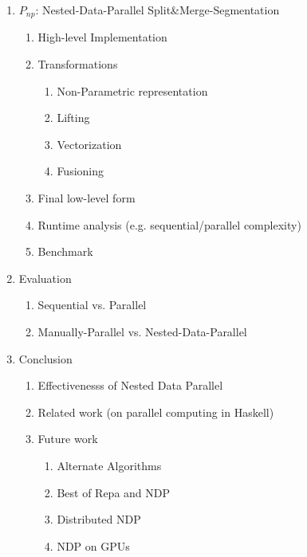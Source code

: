 \documentclass{article}
\newcommand{\ndp}[0]{$P_{np}$}
\newcommand{\algo}[0]{Split\&Merge-Segmentation}
\begin{document}
\begin{itemize}
\begin{enumerate}
        \item \ndp: Nested-Data-Parallel \algo
            \begin{enumerate}
            \item High-level Implementation
            \item Transformations
                \begin{enumerate}
                \item Non-Parametric representation
                \item Lifting
                \item Vectorization
                \item Fusioning
                \end{enumerate}
            \item Final low-level form
            \item Runtime analysis {\tiny (e.g. sequential/parallel complexity)}
            \item Benchmark
            \end{enumerate}

        \item Evaluation
            \begin{enumerate}
            \item Sequential vs. Parallel
            \item Manually-Parallel vs. Nested-Data-Parallel
            \end{enumerate}

        \item Conclusion
            \begin{enumerate}
            \item Effectivenesss of Nested Data Parallel
            \item Related work {\tiny (on parallel computing in Haskell)}
            \item Future work
                \begin{enumerate}
                    \item Alternate Algorithms
                    \item Best of Repa and NDP
                    \item Distributed NDP
                    \item NDP on GPUs
                \end{enumerate}
            \end{enumerate}
        \end{enumerate}


\end{itemize}
\end{document}
